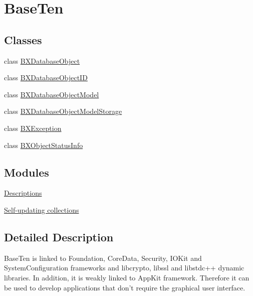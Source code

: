 \hypertarget{group__baseten}{}\section{Base\+Ten}
\label{group__baseten}
\subsection*{Classes}
\begin{DoxyCompactItemize}
\item 
class \hyperlink{interface_b_x_database_object}{B\+X\+Database\+Object}
\item 
class \hyperlink{interface_b_x_database_object_i_d}{B\+X\+Database\+Object\+I\+D}
\item 
class \hyperlink{interface_b_x_database_object_model}{B\+X\+Database\+Object\+Model}
\item 
class \hyperlink{interface_b_x_database_object_model_storage}{B\+X\+Database\+Object\+Model\+Storage}
\item 
class \hyperlink{interface_b_x_exception}{B\+X\+Exception}
\item 
class \hyperlink{interface_b_x_object_status_info}{B\+X\+Object\+Status\+Info}
\end{DoxyCompactItemize}
\subsection*{Modules}
\begin{DoxyCompactItemize}
\item 
\hyperlink{group__descriptions}{Descriptions}
\item 
\hyperlink{group__auto__containers}{Self-\/updating collections}
\end{DoxyCompactItemize}


\subsection{Detailed Description}
Base\+Ten is linked to Foundation, Core\+Data, Security, I\+O\+Kit and System\+Configuration frameworks and libcrypto, libssl and libstdc++ dynamic libraries. In addition, it is weakly linked to App\+Kit framework. Therefore it can be used to develop applications that don't require the graphical user interface. 